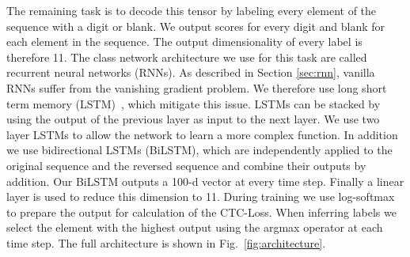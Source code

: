 The remaining task is to decode this tensor by labeling every element of the sequence with a digit or blank.
We output scores for every digit and blank for each element in the sequence.
The output dimensionality of every label is therefore 11.
The class network architecture we use for this task are called recurrent neural networks (RNNs).
As described in Section \ref{sec:rnn}, vanilla RNNs suffer from the vanishing gradient problem.
We therefore use long short term memory (LSTM)~\cite{LSTM}, which mitigate this issue.
LSTMs can be stacked by using the output of the previous layer as input to the next layer.
We use two layer LSTMs to allow the network to learn a more complex function.
In addition we use bidirectional LSTMs (BiLSTM), which are independently applied to the original sequence and the reversed sequence and combine their outputs by addition.
Our BiLSTM outputs a 100-d vector at every time step.
Finally a linear layer is used to reduce this dimension to 11.
During training we use log-softmax to prepare the output for calculation of the CTC-Loss.
When inferring labels we select the element with the highest output using the argmax operator at each time step.
The full architecture is shown in Fig.~\ref{fig:architecture}.

